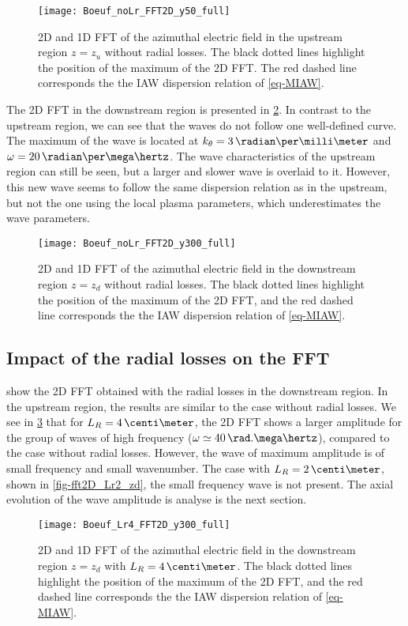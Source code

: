 \begin{figure}[hbt]
  \centering
  \texttt{[image: Boeuf\_noLr\_FFT2D\_y50\_full]}
  \caption{\ac{2D} and \ac{1D} \ac{FFT} of the azimuthal electric field in the upstream region $z=z_u$ without radial losses. The black dotted lines highlight the position of the maximum of the \ac{2D} \ac{FFT}. The red dashed line corresponds the the \ac{IAW} dispersion relation of \cref{eq-MIAW}.}
  \label{fig-fft2D_noLr_zu}
\end{figure}

The \ac{2D} \ac{FFT} in the downstream region is presented in \cref{fig-fft2D_noLr_zd}.
In contrast to the upstream region, we can see that the waves do not follow one well-defined curve.
The maximum of the wave is located at $k_{\theta} = 3\,\radian\per\milli\meter$ and $\omega = 20\, \radian\per\mega\hertz$.
The wave characteristics of the upstream region can still be seen, but a larger and slower wave is overlaid to it.
However, this new wave seems to follow the same dispersion relation as in the upstream, but not the one using the local plasma parameters, which underestimates the wave parameters.


\begin{figure}[hbt]
  \centering
  \texttt{[image: Boeuf\_noLr\_FFT2D\_y300\_full]}
  \caption{\ac{2D} and \ac{1D} \ac{FFT} of the azimuthal electric field in the downstream region $z=z_d$ without radial losses.  The black dotted lines highlight the position of the maximum of the \ac{2D} \ac{FFT}, and the red dashed line corresponds the the \ac{IAW} dispersion relation of \cref{eq-MIAW}.}
  \label{fig-fft2D_noLr_zd}
\end{figure}

\subsection{Impact of the radial losses on the \ac{FFT}} \label{subsec-fft_losses}

 show the \ac{2D} \ac{FFT} obtained with the radial losses in the downstream region.
In the upstream region, the results are similar to the case without radial losses.
We see in \cref{fig-fft2D_Lr4_zd} that for $L_R=4\,\centi\meter$, the \ac{2D} \ac{FFT} shows a larger amplitude for the group of waves of high frequency ($\omega \simeq 40 \,\rad.\mega\hertz$), compared to the case without radial losses.
However, the wave of maximum amplitude is of small frequency and small wavenumber.
The case with $L_R=2\,\centi\meter$, shown in \cref{fig-fft2D_Lr2_zd}, the small frequency wave is not present.
The axial evolution of the wave amplitude is analyse is the next section. 
\begin{figure}[hbt]
  \centering
  \texttt{[image: Boeuf\_Lr4\_FFT2D\_y300\_full]}
  \caption{\ac{2D} and \ac{1D} \ac{FFT} of the azimuthal electric field in the downstream region $z=z_d$ with $L_R=4\,\centi\meter$.  The black dotted lines highlight the position of the maximum of the \ac{2D} \ac{FFT}, and the red dashed line corresponds the the \ac{IAW} dispersion relation of \cref{eq-MIAW}.}
  \label{fig-fft2D_Lr4_zd}
\end{figure}


